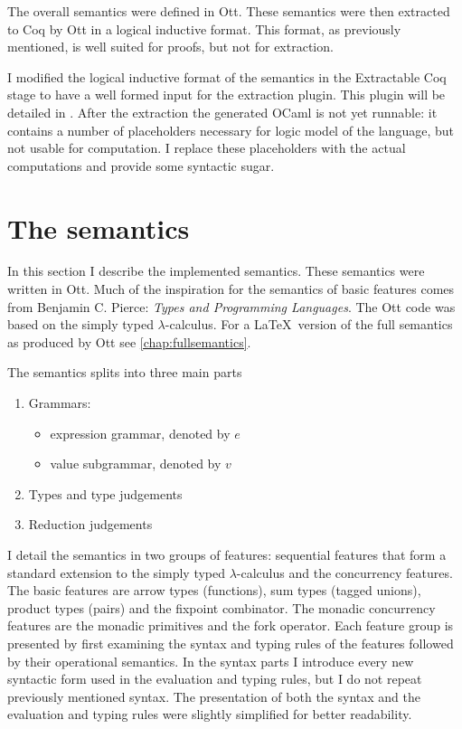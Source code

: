 \documentclass[12pt,twoside,notitlepage]{report}
\theoremstyle{plain}%
\theoremstyle{definition}
\theoremstyle{remark}
\begin{document}
The overall semantics were defined in Ott. These semantics were then extracted to Coq by Ott in a logical inductive format. This format, as previously mentioned, is well suited for proofs, but not for extraction. 

I modified the logical inductive format of the semantics in the Extractable Coq stage to have a well formed input for the extraction plugin. This plugin will be detailed in . After the extraction the generated OCaml is not yet runnable: it contains a number of placeholders necessary for logic model of the language, but not usable for computation. I replace these placeholders with the actual computations and provide some syntactic sugar.
\section{The semantics}\label{sec:the-semanticssec:the-semantics}
In this section I describe the implemented semantics. These semantics were written in Ott.  Much of the inspiration for the semantics of basic features comes from Benjamin C. Pierce: \textit{Types and Programming Languages}\cite{pierce2002types}. The Ott code was based on the simply typed $ \lambda $-calculus\cite{church1940formulation}. For a \LaTeX\, version of the full semantics as produced by Ott see \cref{chap:fullsemantics}.

 
The semantics splits into three main parts
\begin{enumerate}
\item{Grammars:\begin{itemize}
\item{expression grammar, denoted by $ e $}
\item{value subgrammar, denoted by $ v $}
\end{itemize}}
\item{Types and type judgements}
\item{Reduction judgements}
\end{enumerate}

I detail the semantics in two groups of features: sequential features that form a standard extension to the simply typed $ \lambda $-calculus and the concurrency features. The basic features are arrow types (functions), sum types (tagged unions), product types (pairs) and the fixpoint combinator. The monadic concurrency features are the monadic primitives and the fork operator. Each feature group is presented by first examining the syntax and typing rules of the features followed by their operational semantics. In the syntax parts I introduce every new syntactic form used in the evaluation and typing rules, but I do not repeat previously mentioned syntax. The presentation of both the syntax and the evaluation and typing rules were slightly simplified for better readability.   
\end{document}
